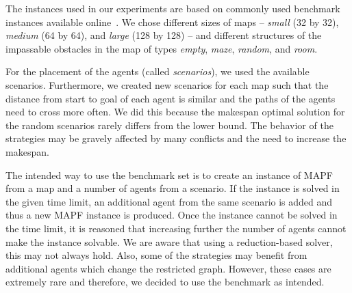 %
The instances used in our experiments are based on commonly used benchmark instances available online~\cite{stern2019mapfVarians}. We chose different sizes of maps -- \emph{small} (32 by 32), \emph{medium} (64 by 64), and \emph{large} (128 by 128) -- and different structures of the impassable obstacles in the map of types \emph{empty}, \emph{maze}, \emph{random}, and \emph{room}. %


For the placement of the agents (called \emph{scenarios}), we used the available scenarios. %
Furthermore, we created new scenarios for each map such that the distance from start to goal of each agent is similar and the paths of the agents need to cross more often. We did this because the makespan optimal solution for the random scenarios rarely differs from the lower bound. %
The behavior of the strategies may be gravely affected by many conflicts and the need to increase the makespan.%

The intended way to use the benchmark set is to create an instance of MAPF from a map and a number of agents from a scenario. If the instance is solved in the given time limit, an additional agent from the same scenario is added and thus a new MAPF instance is produced. Once the instance cannot be solved in the time limit, it is reasoned that increasing further the number of agents cannot make the instance solvable. We are aware that using a reduction-based solver, this may not always hold. Also, some of the strategies may benefit from additional agents which change the restricted graph. However, these cases are extremely rare and therefore, we decided to use the benchmark as intended.


